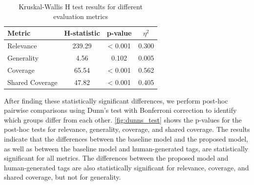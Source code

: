 \begin{table}[h]
    \centering
    \begin{tabular}{lccc}
        \hline
        \textbf{Metric} & \textbf{H-statistic} & \textbf{p-value} & \textbf{$\eta^2$} \\
        \hline
        Relevance       & 239.29               & < 0.001          & 0.300             \\
        Generality      & 4.56                 & 0.102            & 0.005             \\
        Coverage        & 65.54                & < 0.001          & 0.562             \\
        Shared Coverage & 47.82                & < 0.001          & 0.405             \\
        \hline
    \end{tabular}
    \caption{Kruskal-Wallis H test results for different evaluation metrics}
    \label{tab:kruskal_wallis}
\end{table}

After finding these statistically significant differences, we perform post-hoc pairwise comparisons using Dunn's test with Bonferroni correction to identify which groups differ from each other. \cref{fig:dunns_test} shows the p-values for the post-hoc tests for relevance, generality, coverage, and shared coverage. The results indicate that the differences between the baseline model and the proposed model, as well as between the baseline model and human-generated tags, are statistically significant for all metrics. The differences between the proposed model and human-generated tags are also statistically significant for relevance, coverage, and shared coverage, but not for generality.

